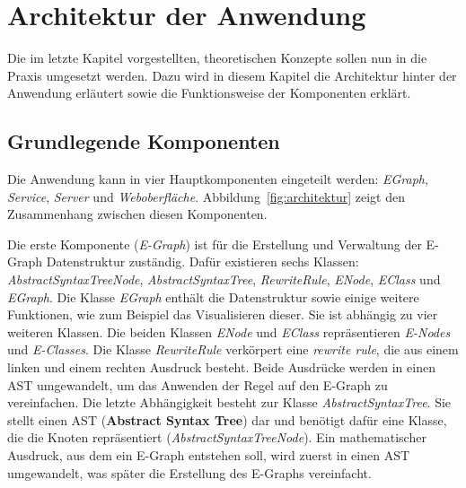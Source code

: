 \section{Architektur der Anwendung}\label{sec:architektur}

Die im letzte Kapitel vorgestellten, theoretischen Konzepte sollen nun in die Praxis umgesetzt werden.
Dazu wird in diesem Kapitel die Architektur hinter der Anwendung erläutert sowie die Funktionsweise der Komponenten erklärt.

\subsection{Grundlegende Komponenten}

Die Anwendung kann in vier Hauptkomponenten eingeteilt werden: \textit{EGraph}, \textit{Service}, \textit{Server} und \textit{Weboberfläche}.
Abbildung~\ref{fig:architektur} zeigt den Zusammenhang zwischen diesen Komponenten. 



Die erste Komponente (\textit{E-Graph}) ist für die Erstellung und Verwaltung der E-Graph Datenstruktur zuständig. Dafür existieren sechs Klassen:
\textit{AbstractSyntaxTreeNode}, \textit{AbstractSyntaxTree}, \textit{RewriteRule}, \textit{ENode}, \textit{EClass} und \textit{EGraph}.
Die Klasse \textit{EGraph} enthält die Datenstruktur sowie einige weitere Funktionen, wie zum Beispiel das Visualisieren dieser.
Sie ist abhängig zu vier weiteren Klassen. Die beiden Klassen \textit{ENode} und \textit{EClass} repräsentieren \textit{E-Nodes} und \textit{E-Classes}.
Die Klasse \textit{RewriteRule} verkörpert eine \textit{rewrite rule}, die aus einem linken und einem rechten Ausdruck besteht. Beide Ausdrücke werden in einen AST umgewandelt, 
um das Anwenden der Regel auf den E-Graph zu vereinfachen.
Die letzte Abhängigkeit besteht zur Klasse \textit{AbstractSyntaxTree}. Sie stellt einen AST (\textbf{Abstract Syntax Tree}) dar und benötigt dafür eine Klasse, 
die die Knoten repräsentiert (\textit{AbstractSyntaxTreeNode}).
Ein mathematischer Ausdruck, aus dem ein E-Graph entstehen soll, wird zuerst in einen AST umgewandelt, was später die Erstellung des E-Graphs vereinfacht.


